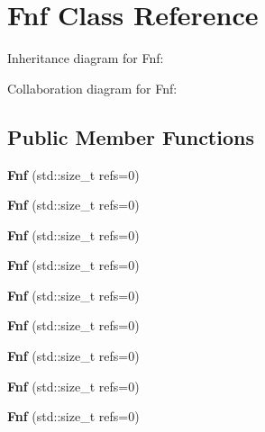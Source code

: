 \hypertarget{class_fnf}{}\section{Fnf Class Reference}
\label{class_fnf}


Inheritance diagram for Fnf\+:


Collaboration diagram for Fnf\+:
\subsection*{Public Member Functions}
\begin{DoxyCompactItemize}
\item 
\mbox{\label{class_fnf_a8846d5fed05c419a3ea8a6362e74d188}} 
{\bfseries Fnf} (std\+::size\+\_\+t refs=0)
\item 
\mbox{\label{class_fnf_a8846d5fed05c419a3ea8a6362e74d188}} 
{\bfseries Fnf} (std\+::size\+\_\+t refs=0)
\item 
\mbox{\label{class_fnf_a8846d5fed05c419a3ea8a6362e74d188}} 
{\bfseries Fnf} (std\+::size\+\_\+t refs=0)
\item 
\mbox{\label{class_fnf_a8846d5fed05c419a3ea8a6362e74d188}} 
{\bfseries Fnf} (std\+::size\+\_\+t refs=0)
\item 
\mbox{\label{class_fnf_a8846d5fed05c419a3ea8a6362e74d188}} 
{\bfseries Fnf} (std\+::size\+\_\+t refs=0)
\item 
\mbox{\label{class_fnf_a8846d5fed05c419a3ea8a6362e74d188}} 
{\bfseries Fnf} (std\+::size\+\_\+t refs=0)
\item 
\mbox{\label{class_fnf_a8846d5fed05c419a3ea8a6362e74d188}} 
{\bfseries Fnf} (std\+::size\+\_\+t refs=0)
\item 
\mbox{\label{class_fnf_a8846d5fed05c419a3ea8a6362e74d188}} 
{\bfseries Fnf} (std\+::size\+\_\+t refs=0)
\item 
\mbox{\label{class_fnf_a8846d5fed05c419a3ea8a6362e74d188}} 
{\bfseries Fnf} (std\+::size\+\_\+t refs=0)
\item 
\mbox{\label{class_fnf_a91782f37db6eb323dec48f84f87ed60b}} 

\end{DoxyCompactItemize}
